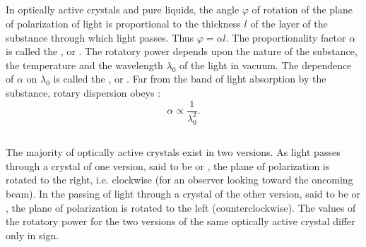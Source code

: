 \subsection{}\label{35.5.2} In optically active crystals and pure liquids, the angle $\varphi$ of rotation of the plane of polarization of light is proportional to the thickness $l$ of the layer of the substance through which light passes. Thus $\varphi = \alpha l$. The proportionality factor $\alpha$ is
called the , or . The rotatory power depends upon the nature of the substance, the temperature and the wavelength $\lambda_{0}$ of the light in vacuum. The dependence of $\alpha$ on $\lambda_{0}$ is called the , or . Far from the band of light absorption by the substance, rotary dispersion obeys :
\begin{equation*}%
\alpha \propto \frac{1}{\lambda_{0}^{2}}.
\end{equation*}

\subsection{}\label{35.5.3} The majority of optically active crystals exist in two versions. As light passes through a crystal of one version, said to be  or , the plane of polarization
is rotated to the right, i.e. clockwise (for an observer looking toward the oncoming beam). In the passing of light through a crystal of the other version, said to be  or , the plane of polarization is rotated to the left (counterclockwise).
The values of the rotatory power for the two versions of the same optically active crystal differ only in sign.

